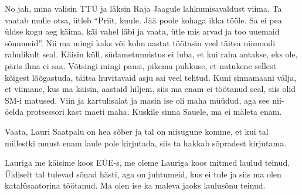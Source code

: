 No jah, mina valisin TTÜ ja läksin Raja Jaagule 
lahkumisavaldust viima. Ta vaatab mulle otsa, ütleb \enquote{Priit, kuule. Jää 
poole kohaga ikka tööle. Sa ei pea üldse kogu aeg käima, käi vahel läbi ja 
vaata, ütle mis arvad ja too uuemaid sõnumeid}. Nii ma mingi kaks või kolm 
aastat töötasin veel täitsa niimoodi rahulikult seal. Käisin küll,  
südametunnistus ei luba, et kui raha antakse, eks ole, päris ilma ei saa. 
Võtsingi mingi pausi, pikema puhkuse, et natukene sellest kõigest lõõgastuda, 
täitsa huvitavaid asju sai veel tehtud. Kuni sinnamaani välja, et viimane, kus 
ma käisin, aastaid hiljem, siis ma enam ei töötanud seal, siis olid SM-i 
matused. Viin ja kartulisalat ja masin ise oli maha müüdud, aga see nii-öelda 
protsessori kast maeti maha. Kuskile sinna Sauele, ma ei mäleta enam. 


Vaata, Lauri Saatpalu on hea sõber ja tal on niisugune komme, et kui tal 
millestki muust enam laule pole kirjutada, siis ta hakkab sõpradest kirjutama. 

Lauriga me käisime koos EÜE-s, me oleme Lauriga koos mitmed laulud teinud. 
Üldiselt tal tulevad sõnad hästi, aga on juhtumeid, kus ei tule ja siis ma olen 
katalüsaatorina  töötanud. Ma olen ise ka maleva jaoks laulusõnu teinud. 

